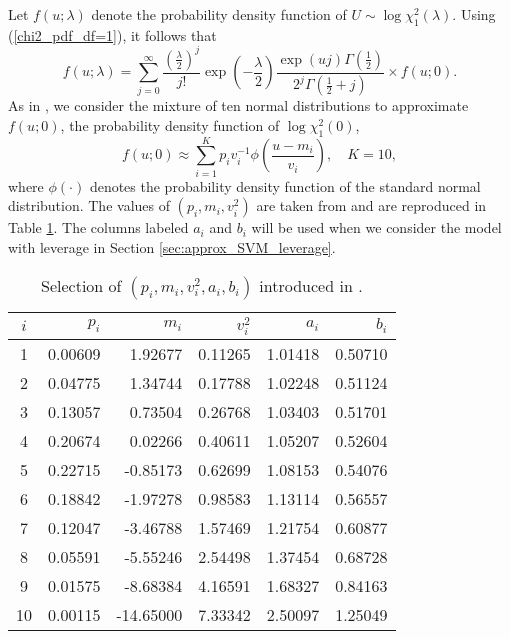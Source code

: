 Let $f(u;\lambda)$ denote the probability density function of $U \sim \log \chi_1^2(\lambda)$.
Using (\ref{chi2_pdf_df=1}),  it follows that
\begin{equation}
    f(u;\lambda) = \sum_{j=0}^{\infty} \frac{\left(\frac{\lambda}{2}\right)^j}{j!} \exp\left(-\frac{\lambda}{2}\right) \frac{\exp(uj) \Gamma\left(\frac{1}{2}\right)}{2^j \Gamma\left(\frac{1}{2}+j\right)} \times f(u;0).
    \label{approx_chi2}
\end{equation}
As in \cite{OmoriChibShephardNakajima(07)}, we consider the mixture of ten normal distributions to approximate $f(u;0)$,  the probability density function of $\log \chi_1^2(0)$,
\begin{equation}
    f(u;0) \approx \sum_{i=1}^{K} p_i v_i^{-1} \phi \left( \frac{u-m_i}{v_i} \right), \quad K=10,
    \label{approx_omori}
\end{equation}
where $\phi(\cdot)$ denotes the probability density function of the standard normal distribution. The values of $(p_i, m_i, v_i^2)$ are taken from \cite{OmoriChibShephardNakajima(07)} and are reproduced in Table \ref{table:approx_chi2}. The columns labeled $a_i$ and $b_i$ will be used when we consider the model with leverage in Section \ref{sec:approx_SVM_leverage}.
\begin{table}[H]
    \small
  \centering
  \begin{tabular}{|c|rrrrr|}
    \hline 
    $i$ & $p_i$  & $m_i$ & $v_i^2$ & $a_i$ & $b_i$ \\
    \hline
    1 & 0.00609 & 1.92677 & 0.11265 & 1.01418 & 0.50710 \\
    2 & 0.04775 & 1.34744 & 0.17788 & 1.02248 & 0.51124 \\
    3 & 0.13057 & 0.73504 & 0.26768 & 1.03403 & 0.51701 \\
    4 & 0.20674 & 0.02266 & 0.40611 & 1.05207 & 0.52604 \\
    5 & 0.22715 & -0.85173 & 0.62699 & 1.08153 & 0.54076 \\
    6 & 0.18842 & -1.97278 & 0.98583 & 1.13114 & 0.56557 \\
    7 & 0.12047 & -3.46788 & 1.57469 & 1.21754 & 0.60877 \\
    8 & 0.05591 & -5.55246 & 2.54498 & 1.37454 & 0.68728 \\
    9 & 0.01575 & -8.68384 & 4.16591 & 1.68327 & 0.84163 \\
    10 & 0.00115 & -14.65000 & 7.33342 & 2.50097 & 1.25049 \\
    \hline
  \end{tabular}
  \caption{Selection of $(p_i, m_i, v_i^2, a_i, b_i)$ introduced in \cite{OmoriChibShephardNakajima(07)}.}
  \label{table:approx_chi2}
  \normalsize
\end{table}
